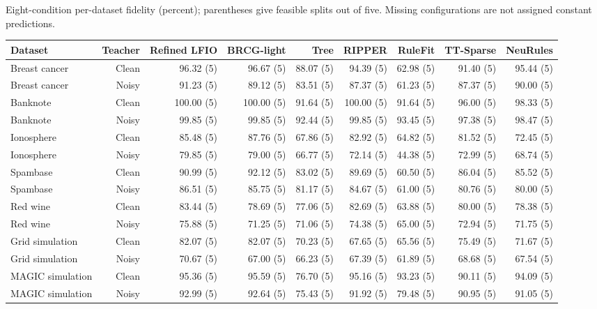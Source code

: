 \begin{kbtable}
\centering
\caption{Eight-condition per-dataset fidelity (percent); parentheses give feasible splits out of five. Missing configurations are not assigned constant predictions.}
\label{tab:strength_datasets}
\small
\begin{adjustbox}{max width=\linewidth}
\begin{tabular}{lrrrrrrrr}
\toprule
Dataset & Teacher & Refined LFIO & BRCG-light & Tree & RIPPER & RuleFit & TT-Sparse & NeuRules \\
\midrule
Breast cancer & Clean & 96.32 (5) & 96.67 (5) & 88.07 (5) & 94.39 (5) & 62.98 (5) & 91.40 (5) & 95.44 (5) \\
Breast cancer & Noisy & 91.23 (5) & 89.12 (5) & 83.51 (5) & 87.37 (5) & 61.23 (5) & 87.37 (5) & 90.00 (5) \\
Banknote & Clean & 100.00 (5) & 100.00 (5) & 91.64 (5) & 100.00 (5) & 91.64 (5) & 96.00 (5) & 98.33 (5) \\
Banknote & Noisy & 99.85 (5) & 99.85 (5) & 92.44 (5) & 99.85 (5) & 93.45 (5) & 97.38 (5) & 98.47 (5) \\
Ionosphere & Clean & 85.48 (5) & 87.76 (5) & 67.86 (5) & 82.92 (5) & 64.82 (5) & 81.52 (5) & 72.45 (5) \\
Ionosphere & Noisy & 79.85 (5) & 79.00 (5) & 66.77 (5) & 72.14 (5) & 44.38 (5) & 72.99 (5) & 68.74 (5) \\
Spambase & Clean & 90.99 (5) & 92.12 (5) & 83.02 (5) & 89.69 (5) & 60.50 (5) & 86.04 (5) & 85.52 (5) \\
Spambase & Noisy & 86.51 (5) & 85.75 (5) & 81.17 (5) & 84.67 (5) & 61.00 (5) & 80.76 (5) & 80.00 (5) \\
Red wine & Clean & 83.44 (5) & 78.69 (5) & 77.06 (5) & 82.69 (5) & 63.88 (5) & 80.00 (5) & 78.38 (5) \\
Red wine & Noisy & 75.88 (5) & 71.25 (5) & 71.06 (5) & 74.38 (5) & 65.00 (5) & 72.94 (5) & 71.75 (5) \\
Grid simulation & Clean & 82.07 (5) & 82.07 (5) & 70.23 (5) & 67.65 (5) & 65.56 (5) & 75.49 (5) & 71.67 (5) \\
Grid simulation & Noisy & 70.67 (5) & 67.00 (5) & 66.23 (5) & 67.39 (5) & 61.89 (5) & 68.68 (5) & 67.54 (5) \\
MAGIC simulation & Clean & 95.36 (5) & 95.59 (5) & 76.70 (5) & 95.16 (5) & 93.23 (5) & 90.11 (5) & 94.09 (5) \\
MAGIC simulation & Noisy & 92.99 (5) & 92.64 (5) & 75.43 (5) & 91.92 (5) & 79.48 (5) & 90.95 (5) & 91.05 (5) \\

\end{tabular}
\end{adjustbox}
\end{kbtable}
